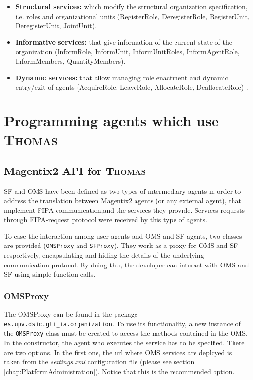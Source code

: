 \begin{itemize}
	\item \textbf{Structural services:} which modify the structural organization specification, i.e. roles and organizational units (RegisterRole, DeregisterRole, RegisterUnit, DeregisterUnit, JointUnit).
	\item \textbf{Informative services:} that give information of the current state of the organization (InformRole, InformUnit, InformUnitRoles, InformAgentRole, InformMembers, QuantityMembers).
	\item \textbf{Dynamic services:} that allow managing role enactment and dynamic entry/exit of agents (AcquireRole, LeaveRole, AllocateRole, DeallocateRole) .
\end{itemize}




\section{Programming agents which use \textsc{Thomas}}

\subsection{Magentix2 API for \textsc{Thomas}}\label{thomasAPI}
SF and OMS have been defined as two types of intermediary agents in order to address the translation between Magentix2 agents (or any external agent), that implement FIPA communication,and the services they provide. Services requests through FIPA-request protocol were received by this type of agents. 

To ease the interaction among user agents and OMS and SF agents, two classes are provided (\lstinline|OMSProxy| and \lstinline|SFProxy|). They work as a proxy for OMS and SF respectively, encapsulating and hiding the details of the underlying communication protocol. By doing this, the developer can interact with OMS and SF using simple function calls.

\subsubsection{OMSProxy}
The OMSProxy can be found in the package \lstinline|es.upv.dsic.gti_ia.organization|. To use its functionality, a new instance of the \lstinline|OMSProxy| class must be created to access the methods contained in the OMS. In the constructor, the agent who executes the service has to be specified. There are two options. In the first one, the url where OMS services are deployed is taken from the \textit{settings.xml} configuration file (please see section \ref{chap:PlatformAdministration}). Notice that this is the recommended option.

